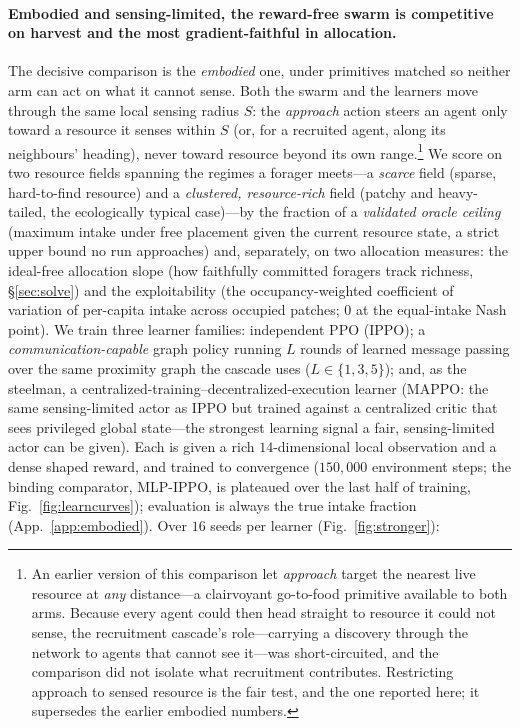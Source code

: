 \documentclass{article}
\begin{document}
\paragraph{Embodied and sensing-limited, the reward-free swarm is competitive on harvest and the most
gradient-faithful in allocation.} The decisive comparison is the \emph{embodied} one, under primitives matched
so neither arm can act on what it cannot sense. Both the swarm and the learners move through the same local
sensing radius $S$: the
\emph{approach} action steers an agent only toward a resource it senses within $S$ (or, for a recruited agent,
along its neighbours' heading), never toward resource beyond its own range.\footnote{An earlier version of this
comparison let \emph{approach} target the nearest live resource at \emph{any} distance---a clairvoyant
go-to-food primitive available to both arms. Because every agent could then head straight to resource it could
not sense, the recruitment cascade's role---carrying a discovery through the network to agents that cannot see
it---was short-circuited, and the comparison did not isolate what recruitment contributes. Restricting approach
to sensed resource is the fair test, and the one reported here; it supersedes the earlier embodied numbers.}
We score on two resource fields spanning the regimes a forager meets---a \emph{scarce} field (sparse,
hard-to-find resource) and a \emph{clustered, resource-rich} field (patchy and heavy-tailed, the ecologically
typical case)---by the fraction of a \emph{validated oracle ceiling} (maximum intake under free placement given
the current resource state, a strict upper bound no run approaches) and, separately, on two allocation measures:
the ideal-free allocation slope (how faithfully committed foragers track richness, \S\ref{sec:solve}) and the
exploitability (the occupancy-weighted coefficient of variation of per-capita intake across occupied patches;
$0$ at the equal-intake Nash point). We train three learner families: independent PPO (IPPO); a
\emph{communication-capable} graph policy running $L$ rounds of learned message passing over the same proximity
graph the cascade uses ($L\in\{1,3,5\}$); and, as the steelman, a centralized-training--decentralized-execution
learner (MAPPO: the same sensing-limited actor as IPPO but trained against a centralized critic that sees
privileged global state---the strongest learning signal a fair, sensing-limited actor can be given). Each is
given a rich $14$-dimensional local observation and a dense shaped reward, and trained to convergence
($150{,}000$ environment steps; the binding comparator, MLP-IPPO, is plateaued over the last half of training,
Fig.~\ref{fig:learncurves}); evaluation is always the true intake fraction (App.~\ref{app:embodied}). Over $16$
seeds per learner (Fig.~\ref{fig:stronger}):
\end{document}
